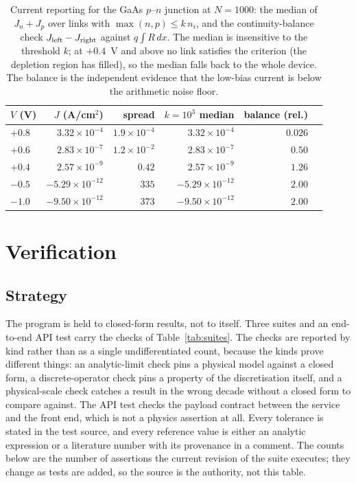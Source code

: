 \documentclass[preprint,12pt]{elsarticle}
\begin{document}
\begin{table}[t]
\centering
\caption{Current reporting for the GaAs $p$--$n$ junction at $N=1000$:
the median of $J_n+J_p$ over links with $\max(n,p)\le k\,n_i$, and the
continuity-balance check $J_{\rm left}-J_{\rm right}$ against
$q\int R\,dx$. The median is insensitive to the threshold $k$; at $+0.4$~V and
above no link satisfies the criterion (the depletion region has filled), so
the median falls back to the whole device. The balance is the independent
evidence that the low-bias current is below the arithmetic noise floor.}
\label{tab:current}
{\small
\setlength{\tabcolsep}{4pt}
\begin{tabular}{@{}lrrrrr@{}}
\toprule
$V$ (V) & $J$ (A/cm$^2$) & spread & $k=10^3$ median & balance (rel.) \\
\midrule
$+0.8$ & $3.32\times10^{-4}$ & $1.9\times10^{-4}$ & $3.32\times10^{-4}$ & $0.026$ \\
$+0.6$ & $2.83\times10^{-7}$ & $1.2\times10^{-2}$ & $2.83\times10^{-7}$ & $0.50$ \\
$+0.4$ & $2.57\times10^{-9}$ & $0.42$ & $2.57\times10^{-9}$ & $1.26$ \\
$-0.5$ & $-5.29\times10^{-12}$ & $335$ & $-5.29\times10^{-12}$ & $2.00$ \\
$-1.0$ & $-9.50\times10^{-12}$ & $373$ & $-9.50\times10^{-12}$ & $2.00$ \\
\bottomrule
\end{tabular}}
\end{table}

\section{Verification}
\label{sec:verification}

\subsection{Strategy}

The program is held to closed-form results, not to itself. Three suites and
an end-to-end API test carry the checks of Table~\ref{tab:suites}. The checks
are reported by kind rather than as a single undifferentiated count, because
the kinds prove different things: an analytic-limit check pins a physical
model against a closed form, a discrete-operator check pins a property of the
discretisation itself, and a physical-scale check catches a result in the
wrong decade without a closed form to compare against. The API test checks
the payload contract between the service and the front end, which is not a
physics assertion at all. Every tolerance is stated in the test source, and
every reference value is either an analytic expression or a literature number
with its provenance in a comment. The counts below are the number of
assertions the current revision of the suite executes; they change as tests
are added, so the source is the authority, not this table.
\end{document}

